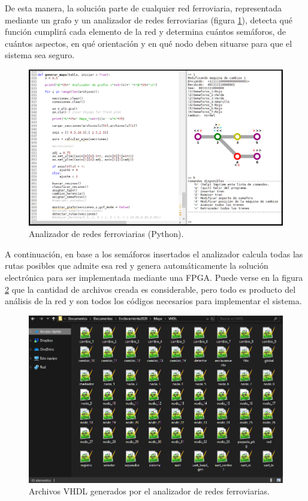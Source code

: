 		De esta manera, la solución parte de cualquier red ferroviaria, representada mediante un grafo y un analizador de redes ferroviarias (figura \ref{fig:Spyder}), detecta qué función cumplirá cada elemento de la red y determina cuántos semáforos, de cuántos aspectos, en qué orientación y en qué nodo deben situarse para que el sistema sea seguro. 
		
		\begin{figure}[htbp!]
			\centering
			\includegraphics[scale=.4]{./Figures/Spyder}
			\caption{Analizador de redes ferroviarias (Python).}
			\label{fig:Spyder}
		\end{figure}
				
		A continuación, en base a los semáforos insertados el analizador calcula todas las rutas posibles que admite esa red y genera automáticamente la solución electrónica para ser implementada mediante una FPGA. Puede verse en la figura \ref{fig:Archivos} que la cantidad de archivos creada es considerable, pero todo es producto del análisis de la red y son todos los códigos necesarios para implementar el sistema.
		
		\begin{figure}[htbp!]
			\centering
			\includegraphics[scale=.5]{./Figures/Archivos}
			\caption{Archivos VHDL generados por el analizador de redes ferroviarias.}
			\label{fig:Archivos}
		\end{figure}
		

